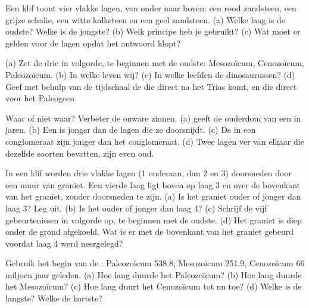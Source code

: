 \begin{exercise}[$\star$]\label{exo:g7:geological-time:2}
Een klif toont vier vlakke lagen, van onder naar boven: een rood zandsteen,
een grijze schalie, een witte kalksteen en een geel zandsteen. (a) Welke
laag is de oudste? Welke is de jongste? (b) Welk principe heb je gebruikt?
(c) Wat moet er gelden voor de lagen opdat het antwoord klopt?
\end{exercise}

\begin{exercise}[$\star$]\label{exo:g7:geological-time:3}
(a) Zet de drie  in volgorde, te beginnen met de oudste: Mesozoïcum,
Cenozoïcum, Paleozoïcum. (b) In welke  leven wij? (c) In welke 
leefden de dinosaurussen? (d) Geef met behulp van de tijdschaal de
 die direct na het Trias komt, en die direct voor het
Paleogeen.
\end{exercise}

\begin{exercise}[$\star$]\label{exo:g7:geological-time:4}
Waar of niet waar? Verbeter de onware zinnen. (a)  geeft
de ouderdom van een  in jaren. (b) Een  is jonger dan de
lagen die ze doorsnijdt. (c) De  in een conglomeraat zijn jonger dan
het conglomeraat. (d) Twee lagen ver van elkaar die dezelfde soorten
 bevatten, zijn even oud.
\end{exercise}

\begin{exercise}[$\star\star$]\label{exo:g7:geological-time:5}
In een klif worden drie vlakke lagen (1 onderaan, dan 2 en 3) doorsneden
door een muur van graniet. Een vierde laag ligt boven op laag 3 en over de
bovenkant van het graniet, zonder doorsneden te zijn. (a) Is het graniet
ouder of jonger dan laag 3? Leg uit. (b) Is het ouder of jonger dan laag 4?
(c) Schrijf de vijf gebeurtenissen in volgorde op, te beginnen met de
oudste. (d) Het graniet is diep onder de grond afgekoeld. Wat is er met de
bovenkant van het graniet gebeurd voordat laag 4 werd neergelegd?
\end{exercise}

\begin{exercise}[$\star\star$]\label{exo:g7:geological-time:6}
Gebruik het begin van de : Paleozoïcum \num{538.8}, Mesozoïcum
\num{251.9}, Cenozoïcum \num{66} miljoen jaar geleden. (a) Hoe lang duurde
het Paleozoïcum? (b) Hoe lang duurde het Mesozoïcum? (c) Hoe lang duurt
het Cenozoïcum tot nu toe? (d) Welke  is de langste? Welke de kortste?
\end{exercise}

